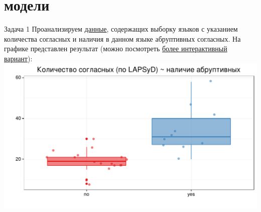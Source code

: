 \section{модели}
\begin{frame}{Задача 1}
Проанализируем \href{http://goo.gl/0btfKa}{\alert{данные}}, содержащих выборку языков с указанием количества согласных и наличия в данном языке абруптивных согласных. На графике представлен результат (можно посмотреть \href{http://goo.gl/JgrU6g}{\alert{более интерактивный вариант}}):\\
\vfill
\includegraphics[width=0.95\linewidth]{ejectives.pdf}
\end{frame}

